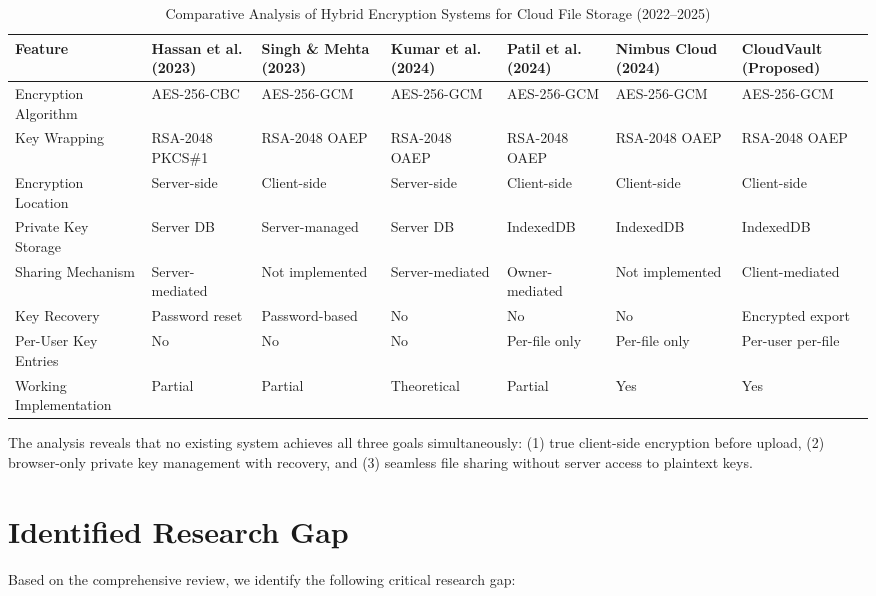 \documentclass[conference]{IEEEtran}
\begin{document}
\begin{table}[t]
\centering
\caption{Comparative Analysis of Hybrid Encryption Systems for Cloud File Storage (2022--2025)}
\label{tab:comparison}
\small
\begin{tabular}{@{}p{2.8cm}p{2cm}p{2cm}p{2.2cm}p{2.2cm}p{2cm}p{2cm}@{}}
\toprule
\textbf{Feature} & \textbf{Hassan et al. (2023)} & \textbf{Singh \& Mehta (2023)} & \textbf{Kumar et al. (2024)} & \textbf{Patil et al. (2024)} & \textbf{Nimbus Cloud (2024)} & \textbf{CloudVault (Proposed)} \\
\midrule
Encryption Algorithm & AES-256-CBC & AES-256-GCM & AES-256-GCM & AES-256-GCM & AES-256-GCM & AES-256-GCM \\[0.3em]
Key Wrapping & RSA-2048 PKCS\#1 & RSA-2048 OAEP & RSA-2048 OAEP & RSA-2048 OAEP & RSA-2048 OAEP & RSA-2048 OAEP \\[0.3em]
Encryption Location & Server-side & Client-side & Server-side & Client-side & Client-side & Client-side \\[0.3em]
Private Key Storage & Server DB & Server-managed & Server DB & IndexedDB & IndexedDB & IndexedDB \\[0.3em]
Sharing Mechanism & Server-mediated & Not implemented & Server-mediated & Owner-mediated & Not implemented & Client-mediated \\[0.3em]
Key Recovery & Password reset & Password-based & No & No & No & Encrypted export \\[0.3em]
Per-User Key Entries & No & No & No & Per-file only & Per-file only & Per-user per-file \\[0.3em]
Working Implementation & Partial & Partial & Theoretical & Partial & Yes & Yes \\
\bottomrule
\end{tabular}
\end{table}

The analysis reveals that no existing system achieves all three goals simultaneously: (1) true client-side encryption before upload, (2) browser-only private key management with recovery, and (3) seamless file sharing without server access to plaintext keys.

\section{Identified Research Gap}

Based on the comprehensive review, we identify the following critical research gap:
\end{document}
